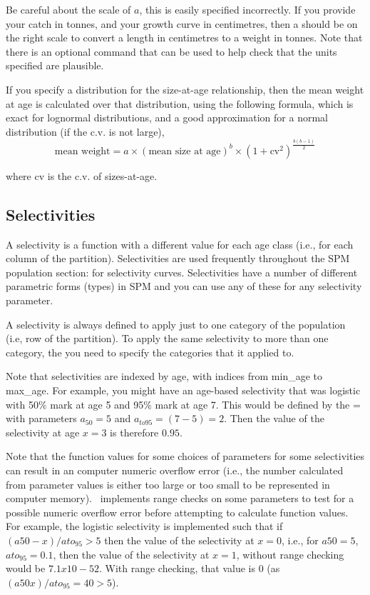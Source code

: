 Be careful about the scale of $a$, \textemdash this is easily specified incorrectly. If you provide your catch in tonnes, and your growth curve in centimetres, then a should be on the right scale to convert a length in centimetres to a weight in tonnes. Note that there is an optional command  that can be used to help check that the units specified are plausible.

If you specify a distribution for the size-at-age relationship, then the mean weight at age is calculated over that distribution, using the following formula, which is exact for lognormal distributions, and a good approximation for a normal distribution (if the c.v. is not large),
\begin{equation}
	\text{mean weight}=a \times (\text{mean size at age})^b \times \left( 1+\text{cv}^2 \right)^{\frac{b(b-1)}{2}}
\end{equation}

where cv is the c.v. of sizes-at-age.

\subsection{Selectivities\label{sec:selectivities}}

A selectivity is a function with a different value for each age class (i.e., for each column of the partition). Selectivities are used frequently throughout the SPM population section: for selectivity curves. Selectivities have a number of different parametric forms (types) in SPM and you can use any of these for any selectivity parameter. 

A selectivity is always defined to apply just to one category of the population (i.e, row of the partition). To apply the same selectivity to more than one category, the you need to specify the categories that it applied to.

Note that selectivities are indexed by age, with indices from min\_age to max\_age. For example, you might have an age-based selectivity that was logistic with 50\% mark at age 5 and 95\% mark at age 7. This would be defined by the = with parameters $a_{50}=5$ and $a_{to95}=(7-5)=2$. Then the value of the selectivity at age $x=3$ is therefore $0.95$.

Note that the function values for some choices of parameters for some selectivities can result in an computer numeric overflow error (i.e., the number calculated from parameter values is either too large or too small to be represented in computer memory). \SPM\ implements range checks on some parameters to test for a possible numeric overflow error before attempting to calculate function values. For example, the logistic selectivity is implemented such that if $(a50-x)/ato_95 > 5$ then the value of the selectivity at $x=0$, i.e., for $a50=5$, $ato_95=0.1$, then the value of the selectivity at $x=1$, without range checking would be $7.1x10-52$. With range checking, that value is $0$ (as $(a50 x)/ato_95=40 > 5$).

